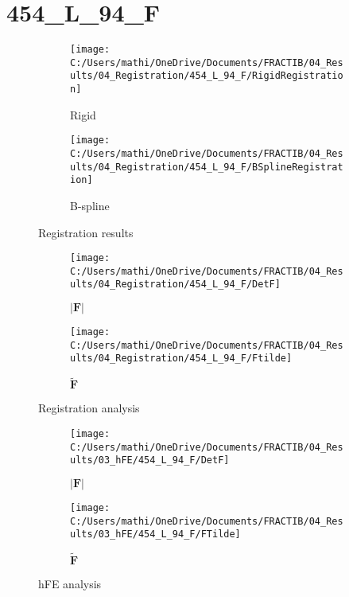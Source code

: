 \documentclass{article}%
\begin{document}
%
\newpage%
\section*{454\_L\_94\_F}%
\label{sec:454L94F}%


\begin{figure}[h!]%
\begin{subfigure}[b]{0.5\linewidth}%
\texttt{[image: C:/Users/mathi/OneDrive/Documents/FRACTIB/04\_Results/04\_Registration/454\_L\_94\_F/RigidRegistration]}%
\caption{Rigid}%
\end{subfigure}%
\begin{subfigure}[b]{0.5\linewidth}%
\texttt{[image: C:/Users/mathi/OneDrive/Documents/FRACTIB/04\_Results/04\_Registration/454\_L\_94\_F/BSplineRegistration]}%
\caption{B{-}spline}%
\end{subfigure}%
\caption{Registration results}%
\end{figure}

%


\begin{figure}[h!]%
\begin{subfigure}[b]{0.5\linewidth}%
\texttt{[image: C:/Users/mathi/OneDrive/Documents/FRACTIB/04\_Results/04\_Registration/454\_L\_94\_F/DetF]}%
\caption{$|\mathbf{F}|$}%
\end{subfigure}%
\begin{subfigure}[b]{0.5\linewidth}%
\texttt{[image: C:/Users/mathi/OneDrive/Documents/FRACTIB/04\_Results/04\_Registration/454\_L\_94\_F/Ftilde]}%
\caption{$\tilde{\mathbf{F}}$}%
\end{subfigure}%
\caption{Registration analysis}%
\end{figure}

%


\begin{figure}[h!]%
\begin{subfigure}[b]{0.5\linewidth}%
\texttt{[image: C:/Users/mathi/OneDrive/Documents/FRACTIB/04\_Results/03\_hFE/454\_L\_94\_F/DetF]}%
\caption{$|\mathbf{F}|$}%
\end{subfigure}%
\begin{subfigure}[b]{0.5\linewidth}%
\texttt{[image: C:/Users/mathi/OneDrive/Documents/FRACTIB/04\_Results/03\_hFE/454\_L\_94\_F/FTilde]}%
\caption{$\tilde{\mathbf{F}}$}%
\end{subfigure}%
\caption{hFE analysis}%
\end{figure}
\end{document}
